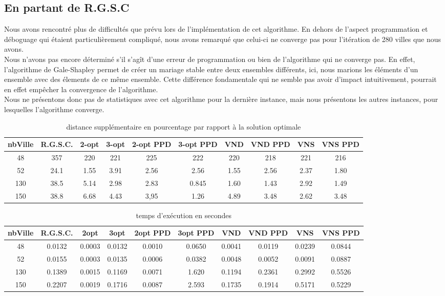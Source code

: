\documentclass[12pt,a4paper]{article}
\begin{document}
\subsection{En partant de R.G.S.C}
Nous avons rencontré plus de difficultés que prévu lors de l'implémentation de cet algorithme. En dehors de l'aspect programmation et déboguage qui étaient particulièrement compliqué, nous avons remarqué que celui-ci ne converge pas pour l'itération de 280 villes que nous avons.\\
Nous n'avons pas encore déterminé s'il s'agît d'une erreur de programmation ou bien de l'algorithme qui ne converge pas. En effet, l'algorithme de Gale-Shapley permet de créer un mariage stable entre deux ensembles différents, ici, nous marions les éléments d'un ensemble avec des élements de ce même ensemble. Cette différence fondamentale qui ne semble pas avoir d'impact intuitivement, pourrait en effet empêcher la convergence de l'algorithme.\\
Nous ne présentons donc pas de statistiques avec cet algorithme pour la dernière instance, mais nous présentons les autres instances, pour lesquelles l'algorithme converge.\\
\begin{table}[!h]
\centering
\begin{tabular}{|*{10}{c|}}
  \hline
  nbVille & R.G.S.C. & 2-opt & 3-opt & 2-opt PPD & 3-opt PPD & VND & VND PPD & VNS & VNS PPD \\
  \hline
  48 & 357 & 220 & 221 & 225 & 222 & 220 & 218 & 221 & 216 \\
  52 & 24.1 & 1.55 & 3.91 & 2.56 & 2.56 & 1.55 & 2.56 & 2.37 & 1.80 \\
  130 & 38.5 & 5.14 & 2.98 & 2.83 & 0.845 & 1.60 & 1.43 & 2.92 & 1.49 \\
  150 & 38.8 & 6.68 & 4.43 & 3,95 & 1.26 & 4.89 & 3.48 & 2.62 & 3.48 \\
  \hline
\end{tabular}
\caption{distance supplémentaire en pourcentage par rapport à la solution optimale}
\label{RGSCpourcentageperf}
\end{table}

\begin{table}[!h]
\centering
\begin{tabular}{|*{10}{c|}}
  \hline
  nbVille & R.G.S.C. & 2opt & 3opt & 2opt PPD & 3opt PPD & VND & VND PPD & VNS & VNS PPD \\
  \hline
  48 & 0.0132 & 0.0003 & 0.0132 & 0.0010 & 0.0650 & 0.0041 & 0.0119 & 0.0239 & 0.0844 \\
  52 & 0.0155 & 0.0003 & 0.0135 & 0.0006 & 0.0382 & 0.0048 & 0.0052 & 0.0091 & 0.0887 \\
  130 & 0.1389 & 0.0015 & 0.1169 & 0.0071 & 1.620 & 0.1194 & 0.2361 & 0.2992 & 0.5526 \\
  150 & 0.2207 & 0.0019 & 0.1716 & 0.0087 & 2.593 & 0.1735 & 0.1914 & 0.5171 & 0.5229 \\
  \hline
\end{tabular}
\caption{temps d’exécution en secondes}
\label{RGSCtemps}
\end{table}
\end{document}
